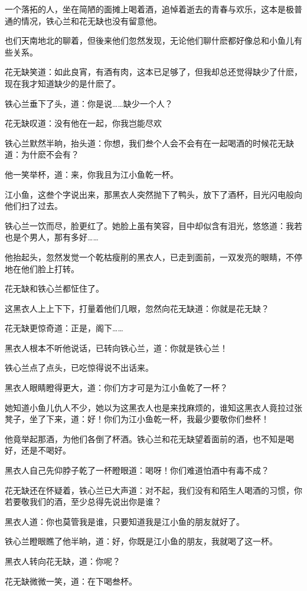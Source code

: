 \documentclass[12pt,oneside]{book}
\begin{document}
一个落拓的人，坐在简陋的面摊上喝着酒，追悼着逝去的青春与欢乐，这本是极普通的情况，铁心兰和花无缺也没有留意他。

也们天南地北的聊着，但後来他们忽然发现，无论他们聊什麽都好像总和小鱼儿有些关系。

花无缺笑道：如此良宵，有酒有肉，这本已足够了，但我却总还觉得缺少了什麽，现在我才知道缺少的是什麽了。

铁心兰垂下了头，道：你是说\ldots\ldots 缺少一个人？

花无缺叹道：没有他在一起，你我岂能尽欢

铁心兰默然半晌，抬头道：你想，我们叁个人会不会有在一起喝酒的时候花无缺道：为什麽不会有？

他一笑举杯，道：来，你我且为江小鱼乾一杯。

江小鱼，这叁个字说出来，那黑衣人突然抛下了鸭头，放下了酒杯，目光闪电般向他们扫了过去。

铁心兰一饮而尽，脸更红了。她脸上虽有笑容，目中却似含有泪光，悠悠道：我若也是个男人，那有多好\ldots\ldots{}

他抬起头，忽然发觉一个乾枯瘦削的黑衣人，已走到面前，一双发亮的眼睛，不停地在他们脸上打转。

花无缺和铁心兰都怔住了。

这黑衣人上上下下，打量着他们几眼，忽然向花无缺道：你就是花无缺？

花无缺更惊奇道：正是，阁下\ldots\ldots{}

黑衣人根本不听他说话，已转向铁心兰，道：你就是铁心兰！

铁心兰点了点头，已吃惊得说不出话来。

黑衣人眼睛瞪得更大，道：你们方才可是为江小鱼乾了一杯？

她知道小鱼儿仇人不少，她以为这黑衣人也是来找麻烦的，谁知这黑衣人竟拉过张凳子，坐了下来，道：好！你们为江小鱼乾一杯，我最少要敬你们叁杯！

他竟举起那酒，为他们各倒了杯酒。铁心兰和花无缺望着面前的酒，也不知是喝好，还是不喝好。

黑衣人自己先仰脖子乾了一杯瞪眼道：喝呀！你们难道怕酒中有毒不成？

花无缺还在怀疑着，铁心兰已大声道：对不起，我们没有和陌生人喝酒的习惯，你若要敬我们的酒，至少总得先说出你是谁？

黑衣人道：你也莫管我是谁，只要知道我是江小鱼的朋友就好了。

铁心兰瞪眼瞧了他半晌，道：好，你既是江小鱼的朋友，我就喝了这一杯。

黑衣人转向花无缺，道：你呢？

花无缺微微一笑，道：在下喝叁杯。
\end{document}
